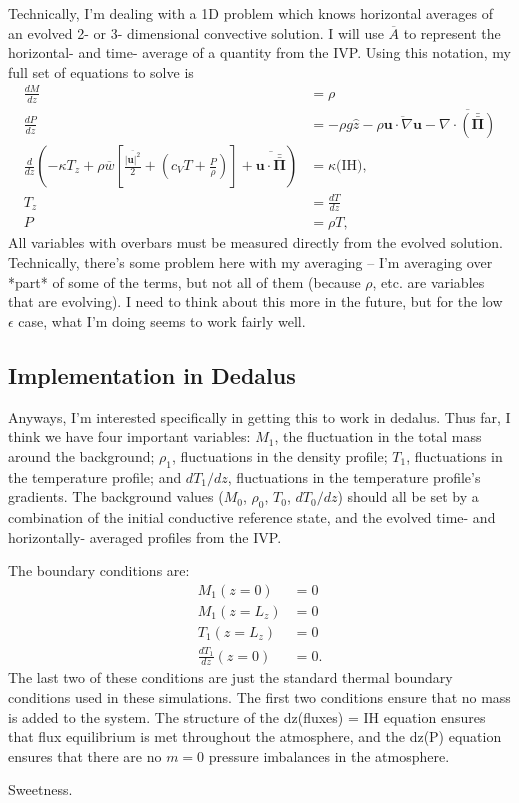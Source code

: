 \documentclass[aps, pre, onecolumn, nofootinbib, notitlepage, groupedaddress, amsfonts, amssymb, amsmath, longbibliography]{revtex4-1}
\newcommand{\Div}[1]{\ensuremath{\nabla\cdot\left( #1\right)}}
\newcommand{\grad}{\ensuremath{\nabla}}
\newcommand{\stressT}{\ensuremath{\bm{\bar{\bar{\Pi}}}}}
\begin{document}
Technically, I'm dealing with a 1D problem which knows horizontal averages of an evolved 2- or 3- dimensional
convective solution.  I will use $\overline{A}$ to represent the horizontal- and time- average of a quantity
from the IVP.  Using this notation, my full set of equations to solve is
\begin{equation}
\begin{split}
\frac{d M}{dz} &= \rho \\
\frac{d P}{dz} &= -\rho g \hat{z} - \rho \overline{\bm{u}\cdot\grad\bm{u}} - \overline{\Div{\stressT}} \\
\frac{d}{dz}\left(-\kappa T_z + \rho\overline{w}\left[\frac{\overline{|\bm{u}|^2}}{2} + 
\left(c_V T + \frac{P}{\rho}\right)\right] + \overline{\bm{u}\cdot\stressT}  \right) &= \kappa \text{(IH)}, \\
T_z &= \frac{dT}{dz} \\
P &= \rho T,
\end{split}
\end{equation}
All variables with overbars must be measured directly from the evolved solution.  Technically, there's some
problem here with my averaging -- I'm averaging over *part* of some of the terms, but not all of them
(because $\rho$, etc. are variables that are evolving).  I need to think about this more in the future,
but for the low $\epsilon$ case, what I'm doing seems to work fairly well.

\subsection{Implementation in Dedalus}
Anyways, I'm interested specifically in getting this to work in dedalus.  Thus far, I think we have four
important variables: $M_1$, the fluctuation in the total mass around the background;
$\rho_1$, fluctuations in the density profile; $T_1$, fluctuations in the temperature profile; and
$dT_1 / dz$, fluctuations in the temperature profile's gradients.  The background values
($M_0$, $\rho_0$, $T_0$, $dT_0/dz$) should all be set by a combination of the
initial conductive reference state, and the evolved time- and horizontally- averaged profiles from the
IVP.

The boundary conditions are:
\begin{equation}
\begin{split}
M_1(z=0) &= 0 \\
M_1(z=L_z) &= 0 \\
T_1(z=L_z) &= 0 \\
\frac{dT_1}{dz}(z=0) &= 0.
\end{split}
\end{equation}
The last two of these conditions are just the standard thermal boundary conditions used in these
simulations.  The first two conditions ensure that no mass is added to the system.  The structure of
the dz(fluxes) = IH equation ensures that flux equilibrium is met throughout the atmosphere, and the
dz(P) equation ensures that there are no $m = 0$ pressure imbalances in the atmosphere.

Sweetness.



\end{document}
